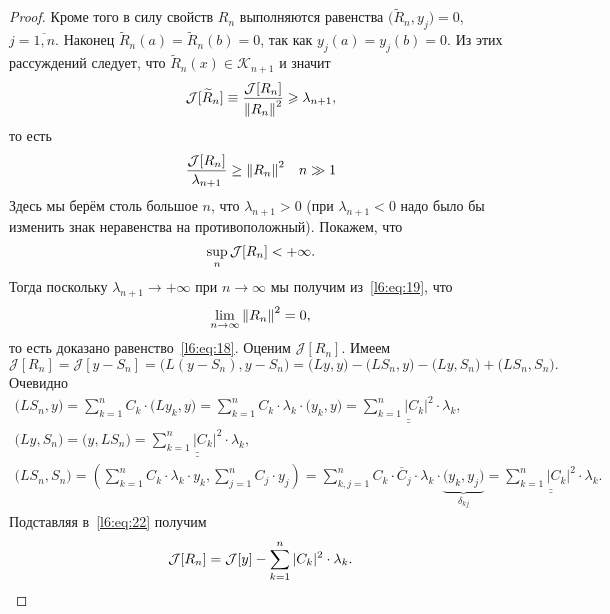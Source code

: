 \documentclass[12pt,a4paper,openany,fleqn]{book}
\newcommand{\J}{\ensuremath{\mathcal{J}}}
\newcommand{\mc}[1]{\ensuremath{\mathcal{#1}}}
\newcommand{\K}{\mc{K}}
\newcommand{\norm}[1]{\ensuremath{\left\|#1\right\|}}
\theoremstyle{definition}
\begin{document}
\begin{proof}
		Кроме того в силу свойств $R_n$ выполняются равенства $\big(\widetilde{R}_n,y_j\big)=0$, $j=\overline{1,n}$. Наконец $\widetilde{R}_n(a)=\widetilde{R}_n(b)=0$, так как $y_j(a)=y_j(b)=0$. Из этих рассуждений следует, что $\widetilde{R}_n(x)\in\K_{n+1}$ и значит 
		\begin{equation*}
			\hfill\J[\widetilde{R}_n]\equiv\frac{\J[R_n]}{{\norm{R_n}}^2}\geqslant\lambda_{n+1},\hfill
		\end{equation*} 
		то есть
		\begin{equation}
			\label{l6:eq:19}
			\hfill\frac{\J[R_n]}{\lambda_{n+1}}\geq{\norm{R_n}}^2\quad n\gg1\hfill
		\end{equation}
		Здесь мы берём столь большое $n$, что $\lambda_{n+1}>0$ (при $\lambda_{n+1}<0$ надо было бы изменить знак неравенства на противоположный). Покажем, что
		\begin{equation}
			\label{l6:eq:20}
			\hfill\sup\limits_{n}\J[R_n]<+\infty.\hfill
		\end{equation}
		Тогда поскольку $\lambda_{n+1}\to+\infty$ при $n\to\infty$ мы получим из~\eqref{l6:eq:19}, что 
		\begin{equation}
			\label{l6:eq:21}
			\hfill\lim\limits_{n\to\infty}{\norm{R_n}}^2=0,\hfill
		\end{equation}
		то есть доказано равенство~\eqref{l6:eq:18}. Оценим $\J[R_n]$. Имеем 
		\begin{equation}
			\label{l6:eq:22}
			\J[R_n]=\J[y-S_n]=\big(L(y-S_n),y-S_n\big)=\big(Ly,y\big)-\big(LS_n,y\big)-\big(Ly,S_n\big)+\big(LS_n,S_n\big).
		\end{equation}
		Очевидно
		\begin{gather*}
			\big(LS_n,y\big)=\sum\limits_{k=1}^n C_k\cdot\big(Ly_k,y\big)=\sum\limits_{k=1}^n C_k\cdot\lambda_k\cdot\big(y_k,y\big)=\underline{\underline{\sum\limits_{k=1}^n |C_k|^2\cdot\lambda_k}},\\			\big(Ly,S_n\big)=\big(y,LS_n\big)=\underline{\underline{\sum\limits_{k=1}^n |C_k|^2\cdot\lambda_k}},\\
			\big(LS_n,S_n\big)=\left(\sum\limits_{k=1}^n C_k\cdot\lambda_k\cdot y_k,\sum\limits_{j=1}^n C_j\cdot y_j\right)=\sum\limits_{k,j=1}^n C_k\cdot \overline{C}_j\cdot\lambda_k\cdot\underbrace{\big(y_k,y_j\big)}_{\delta_{kj}}=\underline{\underline{\sum\limits_{k=1}^n |C_k|^2\cdot\lambda_k}}.
		\end{gather*}
		Подставляя в~\eqref{l6:eq:22} получим 
		\begin{equation*}
			\hfill\J[R_n]=\J[y]-\sum\limits_{k=1}^n|C_k|^2\cdot\lambda_k.\hfill
		\end{equation*}
		

\end{proof}
\end{document}
